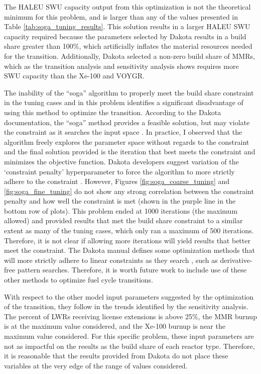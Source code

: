 The \gls{HALEU} \gls{SWU} capacity output from this optimization is not the
theoretical minimum for this problem, and is larger than any of the values 
presented in Table \ref{tab:soga_tuning_results}. This solution results in 
a larger \gls{HALEU} \gls{SWU} capacity required because the parameters selected 
by Dakota results in a build share greater than 100\%, which artificially 
inflates the material resources needed for the transition. Additionally, 
Dakota selected a non-zero build share of \glspl{MMR}, which as the transition 
analysis and sensitivity analysis shows requires more \gls{SWU} capacity than 
the Xe-100 and VOYGR. 

The inability of the ``soga'' algorithm to properly meet the build share 
constraint in the tuning cases and in this problem identifies a significant 
disadvantage of using this method to optimize the transition. According to the 
Dakota documentation, the ``soga'' method provides a feasible solution, but
may violate the constraint as it searches the input space \cite{noauthor_dakota_2021}.
In practice, I observed that the algorithm freely explores the parameter space 
without regards to the constraint and the final solution provided is the 
iteration that best meets the constraint and minimizes the objective function.
Dakota developers suggest variation of the `constraint penalty' hyperparameter 
to force the algorithm to more strictly adhere to the constraint 
\cite{noauthor_optimization_2023}. 
However, Figures \ref{fig:soga_coarse_tuning} and \ref{fig:soga_fine_tuning}
do not show any strong correlation between the constraint penalty and how 
well the constraint is met (shown in the purple line in the bottom row of 
plots). This problem ended at 1000 iterations (the maximum allowed) and 
provided results that met the build share constraint to a similar 
extent as many of the tuning cases, which only ran a maximum of 500 iterations. 
Therefore, it is not clear if allowing more iterations will yield results that 
better meet the constraint. The Dakota manual defines some optimization 
methods that will more strictly adhere to linear constraints as they search
\cite{noauthor_dakota_2021}, such as derivative-free pattern searches. 
Therefore, it is worth future work to include use of these other methods to 
optimize fuel cycle transitions. 

With respect to the other model input parameters suggested by the optimization 
of the transition, they follow in the trends identified by the 
sensitivity analysis. The percent of \glspl{LWR} receiving license extensions
is above 25\%, the \gls{MMR} burnup is at the maximum value considered, 
and the Xe-100 burnup is near the maximum value considered. For this specific 
problem, these input parameters are not as impactful on the results as the 
build share of each reactor type. Therefore, it is reasonable that the 
results provided from Dakota do not place these variables at the very 
edge of the range of values considered. 

